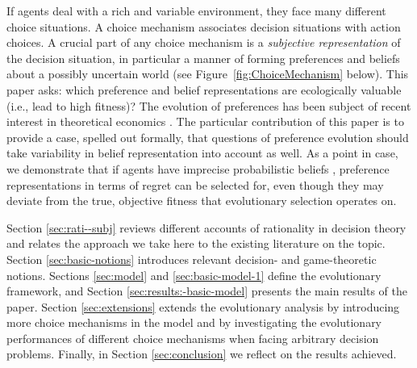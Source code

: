 \documentclass[fleqn,reqno,11pt]{article}
\begin{document}
If agents deal with a rich and variable environment, they face many different choice
situations. A choice mechanism associates decision situations with action choices. A crucial
part of any choice mechanism is a \emph{subjective representation} of the decision situation,
in particular a manner of forming preferences and beliefs about a possibly uncertain world (see
Figure~\ref{fig:ChoiceMechanism} below). This paper asks: which preference and belief
representations are ecologically valuable (i.e., lead to high fitness)? The evolution of
preferences has been subject of recent interest in theoretical economics
\citep[e.g.,][]{algweib13,DekElyYlan07,RobSam11}. The particular contribution of this paper is
to provide a case, spelled out formally, that questions of preference evolution should take
variability in belief representation into account as well. As a point in case, we demonstrate
that if agents have imprecise probabilistic beliefs \citep[e.g.][]{gardsah82,levi74,walley96},
preference representations in terms of regret can be selected for, even though they may deviate
from the true, objective fitness that evolutionary selection operates on.


Section \ref{sec:rati--subj} reviews different accounts of rationality in decision theory and
relates the approach we take here to the existing literature on the topic. Section
\ref{sec:basic-notions} introduces relevant decision- and game-theoretic notions. Sections
\ref{sec:model} and \ref{sec:basic-model-1} define the evolutionary framework, and Section
\ref{sec:results:-basic-model} presents the main results of the paper. Section
\ref{sec:extensions} extends the evolutionary analysis by introducing more choice mechanisms in
the model and by investigating the evolutionary performances of different choice mechanisms
when facing arbitrary decision problems. Finally, in Section \ref{sec:conclusion} we reflect on
the results achieved.
\end{document}
